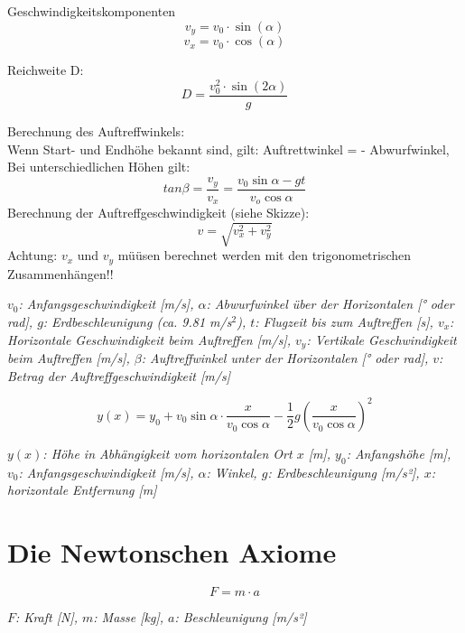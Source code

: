 \documentclass[a4paper,10pt]{article}
\newenvironment{displayformula}
{
	\begin{framed}
		\color{formulaColor}
	}
	{\end{framed}}
\newcommand{\formulalegend}[1]{%
	\par\vspace{0.5ex}%
	{{\color{legendColor}\RaggedRight\small\textit{#1}}}%
	\par\vspace{1.5ex}%
}
\begin{document}
\begin{displayformula}
	Geschwindigkeitskomponenten
	\[
	v_y = v_0 \cdot \sin (\alpha)
	\]
	\[
	v_x = v_0 \cdot \cos (\alpha)
	\]
\end{displayformula}

\begin{displayformula}
	Reichweite D:
	\[
	D = \frac{v_0^2 \cdot \sin (2 \alpha)}{g}
	\]
\end{displayformula}


\begin{displayformula}
	Berechnung des Auftreffwinkels: \\
	Wenn Start- und Endhöhe bekannt sind, gilt: Auftrettwinkel = - Abwurfwinkel, \\ Bei unterschiedlichen Höhen gilt:
	\[
	tan \beta = \frac{v_y}{v_x} = \frac{v_0 \sin \alpha - gt}{v_o \cos \alpha}
	\]
	Berechnung der Auftreffgeschwindigkeit (siehe Skizze):
	\[
	v = \sqrt{v_x^2 + v_y^2}
	\]
	Achtung: $v_x$ und $v_y$ müüsen berechnet werden mit den trigonometrischen Zusammenhängen!!
\end{displayformula}
\formulalegend{
	\( v_0 \): Anfangsgeschwindigkeit [m/s], 
	\( \alpha \): Abwurfwinkel über der Horizontalen [° oder rad], 
	\( g \): Erdbeschleunigung (ca. 9.81 m/s\(^2\)), 
	\( t \): Flugzeit bis zum Auftreffen [s], 
	\( v_x \): Horizontale Geschwindigkeit beim Auftreffen [m/s], 
	\( v_y \): Vertikale Geschwindigkeit beim Auftreffen [m/s], 
	\( \beta \): Auftreffwinkel unter der Horizontalen [° oder rad], 
	\( v \): Betrag der Auftreffgeschwindigkeit [m/s]
}



\begin{displayformula}
	\[
	y(x) = y_0 + v_0\sin\alpha \cdot \frac{x}{v_0 \cos\alpha} - \frac{1}{2} g \left(\frac{x}{v_0\cos\alpha}\right)^2
	\]
\end{displayformula}
\formulalegend{
	\( y(x) \): Höhe in Abhängigkeit vom horizontalen Ort \( x \) [m], \( y_0 \): Anfangshöhe [m], \( v_0 \): Anfangsgeschwindigkeit [m/s], \( \alpha \): Winkel, \( g \): Erdbeschleunigung [m/s²], \( x \): horizontale Entfernung [m]
}



\section{Die Newtonschen Axiome}

\begin{displayformula}
	\[
	F = m \cdot a
	\]
\end{displayformula}
\formulalegend{
	\( F \): Kraft [N], \( m \): Masse [kg], \( a \): Beschleunigung [m/s²]
}
\end{document}
